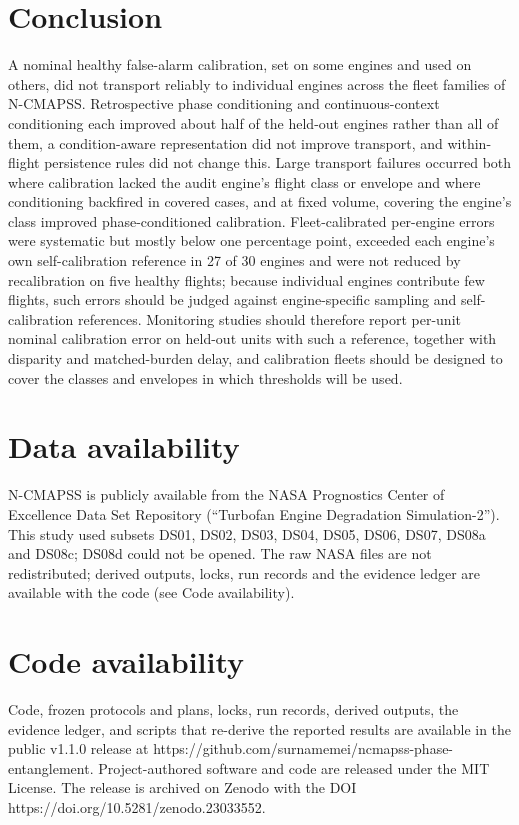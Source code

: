 \documentclass[preprint,11pt,a4paper]{elsarticle}
\begin{document}
\section{Conclusion}

A nominal healthy false-alarm calibration, set on some engines and used on others, did not transport reliably to individual engines across the fleet families of N-CMAPSS. Retrospective phase conditioning and continuous-context conditioning each improved about half of the held-out engines rather than all of them, a condition-aware representation did not improve transport, and within-flight persistence rules did not change this. Large transport failures occurred both where calibration lacked the audit engine's flight class or envelope and where conditioning backfired in covered cases, and at fixed volume, covering the engine's class improved phase-conditioned calibration. Fleet-calibrated per-engine errors were systematic but mostly below one percentage point, exceeded each engine's own self-calibration reference in 27 of 30 engines and were not reduced by recalibration on five healthy flights; because individual engines contribute few flights, such errors should be judged against engine-specific sampling and self-calibration references. Monitoring studies should therefore report per-unit nominal calibration error on held-out units with such a reference, together with disparity and matched-burden delay, and calibration fleets should be designed to cover the classes and envelopes in which thresholds will be used.

\section*{Data availability}

N-CMAPSS is publicly available from the NASA Prognostics Center of Excellence Data Set Repository (``Turbofan Engine Degradation Simulation-2''). This study used subsets DS01, DS02, DS03, DS04, DS05, DS06, DS07, DS08a and DS08c; DS08d could not be opened. The raw NASA files are not redistributed; derived outputs, locks, run records and the evidence ledger are available with the code (see Code availability).

\section*{Code availability}

Code, frozen protocols and plans, locks, run records, derived outputs, the evidence ledger, and scripts that re-derive the reported results are available in the public v1.1.0 release at https://github.com/surnamemei/ncmapss-phase-entanglement. Project-authored software and code are released under the MIT License. The release is archived on Zenodo with the DOI https://doi.org/10.5281/zenodo.23033552.
\end{document}
